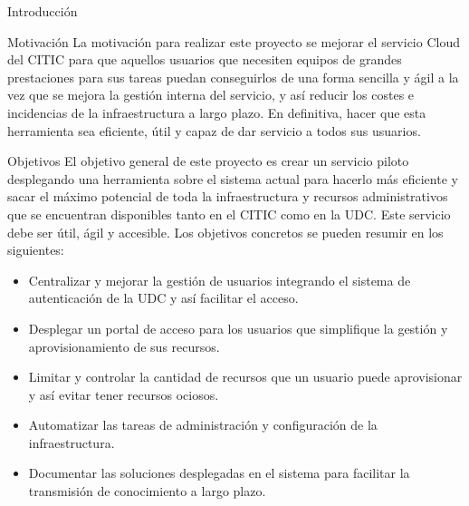 \begin{chapter}{Introducción}


\begin{section}{Motivación}
La motivación para realizar este proyecto se  mejorar el servicio Cloud del CITIC para que aquellos usuarios que necesiten equipos de grandes prestaciones para sus tareas puedan conseguirlos de una forma sencilla y ágil a la vez que se mejora la gestión interna del servicio, y así reducir los costes e incidencias de la infraestructura a largo plazo. En definitiva, hacer que esta herramienta sea eficiente, útil y capaz de dar servicio a todos sus usuarios.
\end{section}

\begin{section}{Objetivos}
El objetivo general de este proyecto es crear un servicio piloto desplegando una herramienta sobre el sistema actual para hacerlo más eficiente y sacar el máximo potencial de toda la infraestructura y recursos administrativos que se encuentran disponibles tanto en el CITIC como en la UDC. Este servicio debe ser útil, ágil y accesible.
Los objetivos concretos se pueden resumir en los siguientes:
\begin{itemize}
    \item Centralizar y mejorar la gestión de usuarios integrando el sistema de autenticación de la UDC y así facilitar el acceso.
    \item Desplegar un portal de acceso para los usuarios que simplifique la gestión y aprovisionamiento de sus recursos.
    \item Limitar y controlar la cantidad de recursos que un usuario puede aprovisionar y así evitar tener recursos ociosos.
    \item Automatizar las tareas de administración y configuración de la infraestructura.
    \item Documentar las soluciones desplegadas en el sistema para facilitar la transmisión de conocimiento a largo plazo.
\end{itemize}
\end{section}


\end{chapter}
